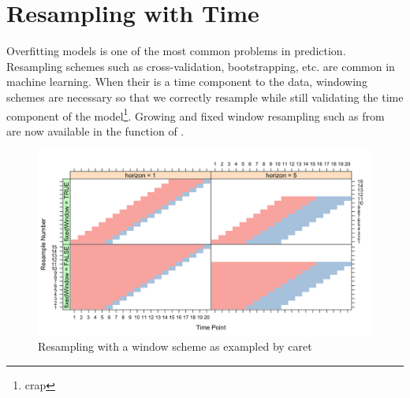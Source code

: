 \documentclass[article]{jss}\usepackage[]{graphicx}\usepackage[]{color}
\begin{document}
\section{Resampling with Time}

Overfitting models is one of the most common problems in prediction. Resampling schemes such as cross-validation, bootstrapping, etc. are common in machine learning. When their is a time component to the data, windowing schemes are necessary so that we correctly resample while still validating the time component of the model\footnote{crap}. Growing and fixed window resampling such as from ~\cite{hyndman2014forecasting} are now available in the  function of .



\begin{figure}[h]
\caption{Resampling with a window scheme as exampled by caret}
  \includegraphics{windowing_pic_caret}
  \centering
\end{figure}
\clearpage


\end{document}
